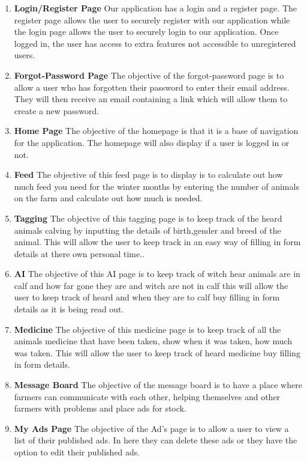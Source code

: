 \documentclass[12pt,a4paper,oneside,openany]{book}
\begin{document}
\begin{enumerate}
    \item \textbf{Login/Register Page} Our application has a login and a register page. The register page allows the user to securely register with our application while the login page allows the user to securely login to our application. Once logged in, the user has access to extra features not accessible to unregistered users.
    
    \item \textbf{Forgot-Password Page}
    The objective of the forgot-password page is to allow a user who has forgotten their password to enter their email address. They will then receive an email containing a link which will allow them to create a new password.

    \item \textbf{Home Page} 
    The objective of the homepage is that it is a base of navigation for the application. The homepage will also display if a user is logged in or not.
    
    \item \textbf{Feed} 
    The objective of this feed page is to display is to calculate out how much feed you need for the winter months by entering the number of animals on the farm and calculate out how much is needed.
    
    \item \textbf{Tagging} 
    The objective of this tagging page is to keep track of the heard animals calving by inputting the details of birth,gender and breed of the animal. This will allow the user to keep track in an easy way of filling in form details at there own personal time..
    
     \item \textbf{AI}
    The objective of this AI page is to keep track of witch hear animals are in calf and how far gone they are and witch are not in calf this will allow the user to keep track of heard and when they are to calf buy filling in form details as it is being read out.
     
     \item \textbf{Medicine}
     The objective of this medicine page is to keep track of all the animals medicine that have been taken, show when it was taken, how much was taken. This will allow the user to keep track of heard medicine buy filling in form details.
     
    \item \textbf{Message Board} 
    The objective of the message board is to have a place where farmers can communicate with each other, helping themselves and other farmers with problems and place ads for stock.
    
    
    \item \textbf{My Ads Page}
    The objective of the Ad’s page is to allow a user to view a list of their published ads. In here they can delete these ads or they have the option to edit their published ads.
\end{enumerate}
\end{document}
